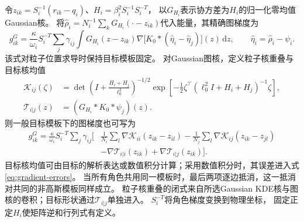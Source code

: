 \documentclass[UTF8,a4paper,11pt,fontset=none]{ctexart}
\begin{document}
令$z_{ik}=S_i^{-1}(r_{ik}-q_i)$、$H_i=\beta_i^2S_i^{-1}S_i^{-T}$，
以$G_{H_i}$表示协方差为$H_i$的归一化零均值Gaussian核。
将$\widehat\rho_i=N_i^{-1}\sum_kG_{H_i}(\cdot-z_{ik})$代入能量，其精确图梯度为
\begin{equation}
g^G_{ik}=\frac{\kappa}{\omega_i}S_i^{-T}\sum_j\gamma_{ij}
\int G_{H_i}(z-z_{ik})\nabla\big[K_0*(\widehat\eta_i-\widehat\eta_j)\big](z)\,\mathrm dz,
\qquad \widehat\eta_i=\widehat\rho_i-\psi_i .
\label{eq:graph-gradient-general}
\end{equation}
该式对粒子位置求导时保持目标模板固定。
对Gaussian图核，定义粒子核重叠与目标核均值
\begin{align}
\mathcal K_{ij}(\zeta)&=
\det\!\left(I+\frac{H_i+H_j}{\ell_0^2}\right)^{-1/2}
\exp\!\left[-\frac12\zeta^\top(\ell_0^2I+H_i+H_j)^{-1}\zeta\right],
\label{eq:kernel-overlap-general}\\
\mathcal T_{i|j}(z)&=(G_{H_i}*K_0*\psi_j)(z).
\nonumber
\end{align}
则一般目标模板下的图梯度也可写为
\begin{equation}
\begin{split}
g^G_{ik}=\frac{\kappa}{\omega_i}S_i^{-T}\sum_j\gamma_{ij}\Big[
&\frac1{N_i}\sum_l\nabla\mathcal K_{ii}(z_{ik}-z_{il})
-\frac1{N_j}\sum_l\nabla\mathcal K_{ij}(z_{ik}-z_{jl})\\
&-\nabla\mathcal T_{i|i}(z_{ik})+\nabla\mathcal T_{i|j}(z_{ik})\Big].
\end{split}
\label{eq:graph-target-correction}
\end{equation}
目标核均值可由目标的解析表达或数值积分计算；采用数值积分时，其误差进入式\eqref{eq:gradient-errors}。
当所有角色共用同一模板时，最后两项逐边抵消，这一抵消对共同的非高斯模板同样成立。
粒子核重叠的闭式来自所选Gaussian KDE核与图核的卷积；目标形状通过$\mathcal T_{i|j}$单独进入。
$S_i^{-T}$将角色梯度变换到物理坐标，
固定正定$H_i$使矩阵逆和行列式有定义。
\end{document}
